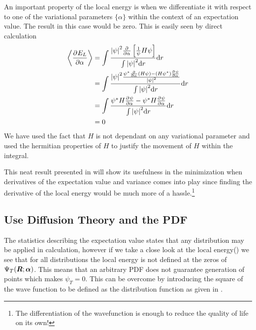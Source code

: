         An important property of the local energy is when we differentiate it
        with respect to one of the variational parameters $\{\alpha\}$ within
        the context of an expectation value. The result in this case would be
        zero. This is easily seen by direct calculation
            \begin{align}
                \ecp{\prd{\alpha}[E_L]} &= \int \frac{\abs{\psi}^2\prd{\alpha}
                \left[\frac{1}{\psi}H\psi\right]}{\int \abs{\psi}^2 \md r} \md
                r \nonumber \\
                &= \int \frac{\abs{\psi}^2 \frac{\psi^{*}\prd{\alpha}(H\psi) -
                (H\psi^{*}) \prd{\alpha}[\psi]}{\abs{\psi}^2}}{\int
                \abs{\psi}^2 \md r} \md r \nonumber \\
                &= \int \frac{\psi^{*}H\prd{\alpha}[\psi] -
                \psi^{*}H\prd{\alpha}[\psi]}{\int \abs{\psi}^2 \md r} \md r
                \nonumber \\
                &= 0
                \label{eq:expELdelzero}
            \end{align}
        We have used the fact that $H$ is not dependant on any variational
        parameter and used the hermitian properties\cite{GriffQuan} of $H$ to
        justify the movement of $H$ within the integral. 

        This neat result presented in  will show its
        usefulness in the minimization when derivatives of the expectation
        value and variance comes into play since finding the derivative of the
        local energy would be much more of a hassle.\footnote{The
        differentiation of the wavefunction is enough to reduce the quality of
        life on its own!}
    \subsection{Use Diffusion Theory and the PDF\label{susec:diffTHpdf}}
        The statistics describing the expectation value states that any
        distribution may be applied in calculation, however if we take a close
        look at the local energy() we see that for all
        distributions the local energy is not defined at the zeros of ${\Psi}_T(\boldsymbol{{R}};\boldsymbol{{\alpha}})$.
        This means that an arbitrary PDF does not guarantee generation of
        points which makes $\psi_T=0$. This can be overcome by introducing the
        square of the wave function to be defined as the distribution function
        as given in .

